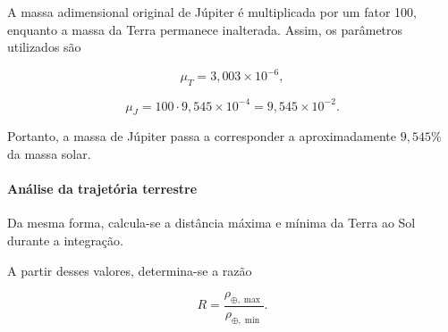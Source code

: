 \documentclass[12pt,a4paper]{article}
\begin{document}
A massa adimensional original de Júpiter é multiplicada por um fator 100, enquanto a massa da Terra permanece inalterada. Assim, os parâmetros utilizados são

\begin{equation}
    \mu_T=3,003\times10^{-6},
\end{equation}

\begin{equation}
    \mu_J=100\cdot9,545\times10^{-4}
    =9,545\times10^{-2}.
\end{equation}

Portanto, a massa de Júpiter passa a corresponder a aproximadamente $9,545\%$ da massa solar.

\paragraph{Análise da trajetória terrestre}

Da mesma forma, calcula-se a distância máxima e mínima da Terra ao Sol durante a integração.

A partir desses valores, determina-se a razão

\begin{equation}
    R=
    \frac{\rho_{\oplus,\max}}
    {\rho_{\oplus,\min}}.
\end{equation}
\end{document}

